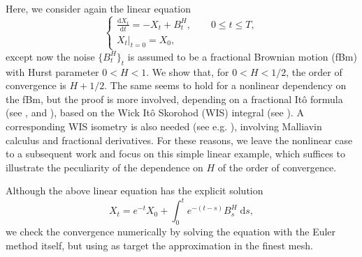 \documentclass[reqno,12pt]{amsart}
\theoremstyle{plain}%
\theoremstyle{definition}
\begin{document}
Here, we consider again the linear equation
\begin{equation}
    \label{linearnonhomogeneousrode2}
    \begin{cases}
        \displaystyle \frac{\mathrm{d}X_t}{\mathrm{d} t} = -X_t + B^H_t, \qquad 0 \leq t \leq T, \\
        \left. X_t \right|_{t = 0} = X_0,
      \end{cases}
\end{equation}
except now the noise $\{B^H_t\}_t$ is assumed to be a fractional Brownian motion (fBm) with Hurst parameter $0 < H < 1$. We show that, for $0 < H < 1/2$, the order of convergence is $H + 1/2$. The same seems to hold for a nonlinear dependency on the fBm, but the proof is more involved, depending on a fractional It\^o formula (see \cite[Theorem 4.2.6]{BHOB2008}, \cite[Theorem 4.1]{Bender2003}and \cite[Theorem 2.7.4]{Mishura2008}), based on the Wick It\^o Skorohod (WIS) integral (see \cite[Chapter 4]{BHOB2008}). A corresponding WIS isometry is also needed (see e.g. \cite[Theorem 4.5.6]{BHOB2008}), involving Malliavin calculus and fractional derivatives. For these reasons, we leave the nonlinear case to a subsequent work and focus on this simple linear example, which suffices to illustrate the peculiarity of the dependence on $H$ of the order of convergence.

Although the above linear equation has the explicit solution
\begin{equation}
    X_t = e^{-t}X_0 + \int_0^t e^{-(t-s)}B^H_s\;\mathrm{d}s,
\end{equation}
we check the convergence numerically by solving the equation with the Euler method itself, but using as target the approximation in the finest mesh.
\end{document}
